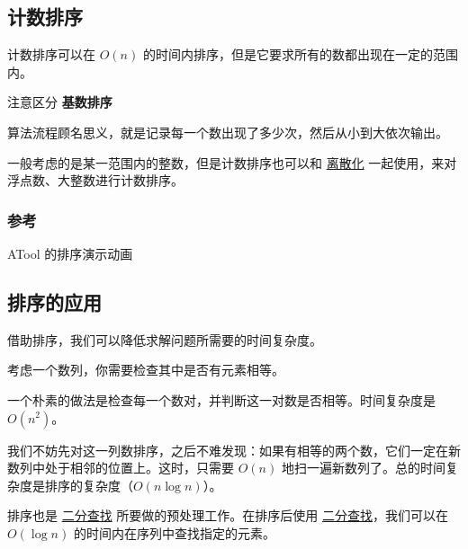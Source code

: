 \href{https://stackoverflow.com/questions/22339240/what-algorithms-are-used-in-c11-stdsort-in-different-stl-implementations}{}

\href{https://en.cppreference.com/w/cpp/algorithm/sort}{}

\subsection{计数排序}

计数排序可以在 $O(n)$ 的时间内排序，但是它要求所有的数都出现在一定的范围内。

\begin{NOTE}{}{}
注意区分 \textbf{ 基数排序 }
\end{NOTE}


算法流程顾名思义，就是记录每一个数出现了多少次，然后从小到大依次输出。

一般考虑的是某一范围内的整数，但是计数排序也可以和 \href{/misc/discrete}{离散化} 一起使用，来对浮点数、大整数进行计数排序。

\subsubsection{参考}

\href{http://atool.org/sort.php}{} ATool 的排序演示动画  

\href{https://www.geeksforgeeks.org/counting-sort/}{}   

\subsection{排序的应用}

借助排序，我们可以降低求解问题所需要的时间复杂度。

考虑一个数列，你需要检查其中是否有元素相等。

一个朴素的做法是检查每一个数对，并判断这一对数是否相等。时间复杂度是 $O(n^2)$。

我们不妨先对这一列数排序，之后不难发现：如果有相等的两个数，它们一定在新数列中处于相邻的位置上。这时，只需要 $O(n)$ 地扫一遍新数列了。总的时间复杂度是排序的复杂度（$O(n\log n)$）。

排序也是 \href{/basic/binary/}{二分查找} 所要做的预处理工作。在排序后使用 \href{/basic/binary/}{二分查找}，我们可以在 $O(\log n)$ 的时间内在序列中查找指定的元素。
